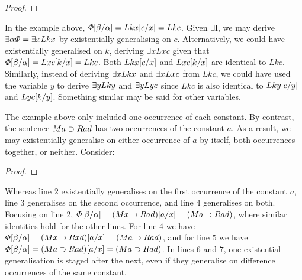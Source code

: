 \begin{proof}
     
	   
\end{proof}

In the example above, $\varPhi[\beta/\alpha]=Lkx[c/x]=Lkc$.
Given $\exists$I, we may derive $\exists \alpha\varPhi=\exists xLkx$ by existentially generalising on $c$.
Alternatively, we could have existentially generalised on $k$, deriving $\exists xLxc$ given that $\varPhi[\beta/\alpha]=Lxc[k/x]=Lkc$. 
Both $Lkx[c/x]$ and $Lxc[k/x]$ are identical to $Lkc$. 
Similarly, instead of deriving $\exists xLkx$ and $\exists xLxc$ from $Lkc$, we could have used the variable $y$ to derive $\exists yLky$ and $\exists yLyc$ since $Lkc$ is also identical to $Lky[c/y]$ and $Lyc[k/y]$.
Something similar may be said for other variables.

The example above only included one occurrence of each constant.
By contrast, the sentence $Ma \supset Rad$ has two occurrences of the constant $a$.
As a result, we may existentially generalise on either occurrence of $a$ by itself, both occurrences together, or neither.
Consider:

\begin{proof}
	 \pr{}
	 
	 
	 
	 
	 
	 
\end{proof}

Whereas line $2$ existentially generalises on the first occurrence of the constant $a$, line $3$ generalises on the second occurrence, and line $4$ generalises on both. 
Focusing on line $2$, $\varPhi[\beta/\alpha]=(Mx \supset Rad)[a/x]=(Ma \supset Rad)$, where similar identities hold for the other lines.
For line $4$ we have $\varPhi[\beta/\alpha]=(Mx \supset Rxd)[a/x]=(Ma \supset Rad)$, and for line $5$ we have $\varPhi[\beta/\alpha]=(Ma \supset Rad)[a/x]=(Ma \supset Rad)$.
In lines $6$ and $7$, one existential generalisation is staged after the next, even if they generalise on difference occurrences of the same constant. 

